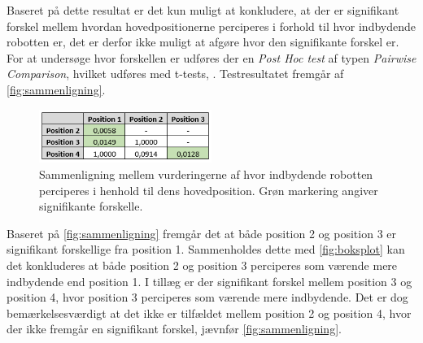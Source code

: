 Baseret på dette resultat er det kun muligt at konkludere, at der er signifikant forskel mellem hvordan hovedpositionerne perciperes i forhold til hvor indbydende robotten er, det er derfor ikke muligt at afgøre hvor den signifikante forskel er. For at undersøge hvor forskellen er udføres der en \textit{Post Hoc test} af typen \textit{Pairwise Comparison}, hvilket udføres med t-tests, \parencite[s. 1338]{DiscoveringStatisticsUsingR}. Testresultatet fremgår af \autoref{fig:sammenligning}.
%
\begin{figure}[H]
\centering
\includegraphics[width = 0.5\textwidth]{Figure/PostHocExcel.PNG} 
\caption{Sammenligning mellem vurderingerne af hvor indbydende robotten perciperes i henhold til dens hovedposition. Grøn markering angiver signifikante forskelle.}
\label{fig:sammenligning}
\end{figure}
\noindent
%
Baseret på \autoref{fig:sammenligning} fremgår det at både position 2 og position 3 er signifikant forskellige fra position 1. Sammenholdes dette med \autoref{fig:boksplot} kan det konkluderes at både position 2 og position 3 perciperes som værende mere indbydende end position 1. I tillæg er der signifikant forskel mellem position 3 og position 4, hvor position 3 perciperes som værende mere indbydende. Det er dog bemærkelsesværdigt at det ikke er tilfældet mellem position 2 og position 4, hvor der ikke fremgår en signifikant forskel, jævnfør \autoref{fig:sammenligning}.
%

